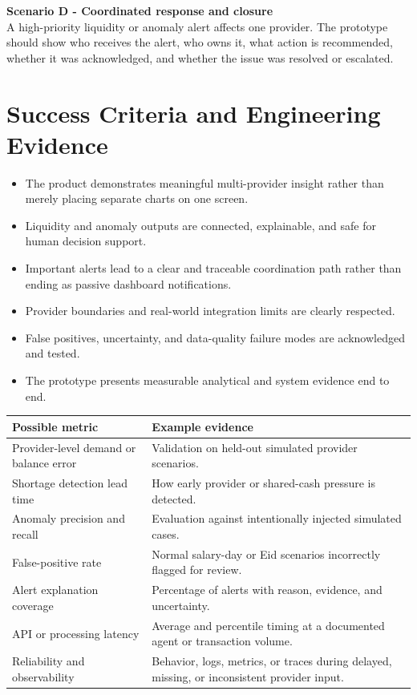 \documentclass[11pt,a4paper]{article}
\begin{document}
\textbf{Scenario D - Coordinated response and closure}\\
A high-priority liquidity or anomaly alert affects one provider. The prototype should show who receives the alert, who owns it, what action is recommended, whether it was acknowledged, and whether the issue was resolved or escalated.

\section{Success Criteria and Engineering Evidence}
\begin{itemize}[noitemsep]
    \item The product demonstrates meaningful multi-provider insight rather than merely placing separate charts on one screen.
    \item Liquidity and anomaly outputs are connected, explainable, and safe for human decision support.
    \item Important alerts lead to a clear and traceable coordination path rather than ending as passive dashboard notifications.
    \item Provider boundaries and real-world integration limits are clearly respected.
    \item False positives, uncertainty, and data-quality failure modes are acknowledged and tested.
    \item The prototype presents measurable analytical and system evidence end to end.
\end{itemize}

\vspace{1em}
\noindent
\begin{tabularx}{\textwidth}{@{} l X @{}}
\toprule
\textbf{Possible metric} & \textbf{Example evidence} \\
\midrule
Provider-level demand or balance error & Validation on held-out simulated provider scenarios. \\
\addlinespace
Shortage detection lead time & How early provider or shared-cash pressure is detected. \\
\addlinespace
Anomaly precision and recall & Evaluation against intentionally injected simulated cases. \\
\addlinespace
False-positive rate & Normal salary-day or Eid scenarios incorrectly flagged for review. \\
\addlinespace
Alert explanation coverage & Percentage of alerts with reason, evidence, and uncertainty. \\
\addlinespace
API or processing latency & Average and percentile timing at a documented agent or transaction volume. \\
\addlinespace
Reliability and observability & Behavior, logs, metrics, or traces during delayed, missing, or inconsistent provider input. \\
\bottomrule
\end{tabularx}
\end{document}
